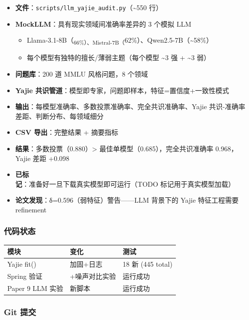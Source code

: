 \documentclass[
  12pt,
]{ctexart}
\providecommand{\tightlist}{%
  \setlength{\itemsep}{0pt}\setlength{\parskip}{0pt}}
\begin{document}
\begin{itemize}
\tightlist
\item
  \textbf{文件}：\texttt{scripts/llm\_yajie\_audit.py}（\textasciitilde550
  行）
\item
  \textbf{MockLLM}：具有现实领域间准确率差异的 3 个模拟 LLM

  \begin{itemize}
  \tightlist
  \item
    Llama-3.1-8B（\textsubscript{66\%）、Mistral-7B（}62\%）、Qwen2.5-7B（\textasciitilde58\%）
  \item
    每个模型有独特的擅长/薄弱主题（每个模型 \textasciitilde3 强 +
    \textasciitilde3 弱）
  \end{itemize}
\item
  \textbf{问题库}：200 道 MMLU 风格问题，8 个领域
\item
  \textbf{Yajie
  共识管道}：模型即专家，问题即样本，特征=置信度+一致性模式
\item
  \textbf{输出}：每模型准确率、多数投票准确率、完全共识准确率、Yajie
  共识-准确率差距、判断分布、每领域细分
\item
  \textbf{CSV 导出}：完整结果 + 摘要指标
\item
  \textbf{结果}：多数投票（0.880）\textgreater{}
  最佳单模型（0.685），完全共识准确率 0.968，Yajie 差距 +0.098
\item
  \textbf{已标记}：准备好一旦下载真实模型即可运行（TODO
  标记用于真实模型加载）
\item
  \textbf{论文发现}：δ=0.596（弱特征）警告------LLM 背景下的 Yajie
  特征工程需要 refinement
\end{itemize}

\subsubsection{代码状态}\label{ux4ee3ux7801ux72b6ux6001-2}

\begin{longtable}[]{@{}lll@{}}
\toprule\noalign{}
模块 & 变化 & 测试 \\
\midrule\noalign{}
\endhead
\bottomrule\noalign{}
\endlastfoot
Yajie fit() & 加固+日志 & 18 新 (445 total) \\
Spring 验证 & +噪声对比实验 & 运行成功 \\
Paper 9 LLM 实验 & 新脚本 & 运行成功 \\
\end{longtable}

\subsubsection{Git 提交}\label{git-ux63d0ux4ea4-1}
\end{document}
